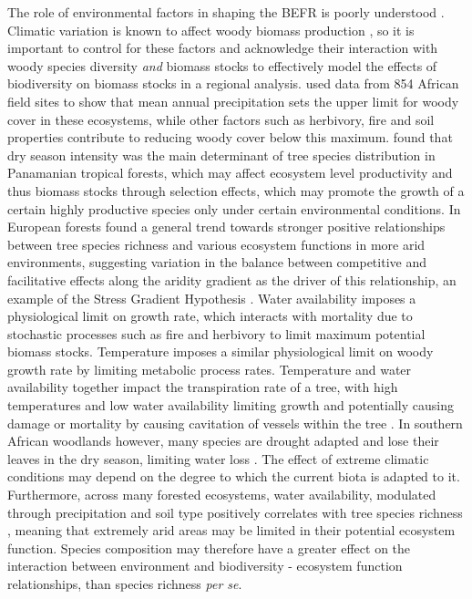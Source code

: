 \documentclass[11pt,a4paper]{article}
\begin{document}
The role of environmental factors in shaping the BEFR is poorly understood \citep{Ratcliffe2017}. Climatic variation is known to affect woody biomass production \citep{Michaletz2014}, so it is important to control for these factors and acknowledge their interaction with woody species diversity \textit{and} biomass stocks to effectively model the effects of biodiversity on biomass stocks in a regional analysis. \citet{Sankaran2005} used data from 854 African field sites to show that mean annual precipitation sets the upper limit for woody cover in these ecosystems, while other factors such as herbivory, fire and soil properties contribute to reducing woody cover below this maximum. \citet{Condit2013} found that dry season intensity was the main determinant of tree species distribution in Panamanian tropical forests, which may affect ecosystem level productivity and thus biomass stocks through selection effects, which may promote the growth of a certain highly productive species only under certain environmental conditions. In European forests \citep{Ratcliffe2017} found a general trend towards stronger positive relationships between tree species richness and various ecosystem functions in more arid environments, suggesting variation in the balance between competitive and facilitative effects along the aridity gradient as the driver of this relationship, an example of the Stress Gradient Hypothesis \citep{Dohn2013}. Water availability imposes a physiological limit on growth rate, which interacts with mortality due to stochastic processes such as fire and herbivory to limit maximum potential biomass stocks. Temperature imposes a similar physiological limit on woody growth rate by limiting metabolic process rates. Temperature and water availability together impact the transpiration rate of a tree, with high temperatures and low water availability limiting growth and potentially causing damage or mortality by causing cavitation of vessels within the tree \citep{Rowland2015a, Fensham2009}. In southern African woodlands however, many species are drought adapted and lose their leaves in the dry season, limiting water loss \citep{Solbrig1996}. The effect of extreme climatic conditions may depend on the degree to which the current biota is adapted to it. Furthermore, across many forested ecosystems, water availability, modulated through precipitation and soil type positively correlates with tree species richness \citep{Vila2005}, meaning that extremely arid areas may be limited in their potential ecosystem function. Species composition may therefore have a greater effect on the interaction between environment and biodiversity - ecosystem function relationships, than species richness \textit{per se}.
\end{document}
